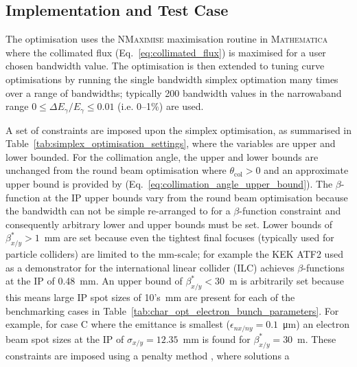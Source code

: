 \documentclass[../main.tex]{subfiles}
\begin{document}
\subsection{Implementation and Test Case}

The optimisation uses the \textsc{NMaximise} maximisation routine in \textsc{Mathematica} \cite{wolfram2021nmaximize} where the collimated flux (Eq.~\ref{eq:collimated_flux}) is maximised for a user chosen bandwidth value. The optimisation is then extended to tuning curve optimisations by running the single bandwidth simplex optimation many times over a range of bandwidths; typically 200 bandwidth values in the narrowaband range $0 \leq \Delta E_{\gamma}/E_{\gamma} \leq 0.01$ (i.e. 0--1\%) are used.   

A set of constraints are imposed upon the simplex optimisation, as summarised in Table~\ref{tab:simplex_optimisation_settings}, where the variables are upper and lower bounded. For the collimation angle, the upper and lower bounds are unchanged from the round beam optimisation where $\theta_{\mathrm{col}} > 0$ and an approximate upper bound is provided by (Eq.~\ref{eq:collimation_angle_upper_bound}). The $\beta$-function at the IP upper bounds vary from the round beam optimisation because the bandwidth can not be simple re-arranged to for a $\beta$-function constraint and consequently arbitrary lower and upper bounds must be set. Lower bounds of $\beta_{x/y}^{*} > 1$~\si{\milli\meter} are set because even the tightest final focuses (typically used for particle colliders) are limited to the \si{\milli\meter}-scale; for example the KEK ATF2 \cite{okugi2016achievemen} used as a demonstrator for the international linear collider (ILC) \cite{yamamoto2021international} achieves $\beta$-functions at the IP of 0.48~\si{\milli\meter}. An upper bound of $\beta_{x/y}^{*} < 30$~\si{\meter} is arbitrarily set because this means large IP spot sizes of 10's~\si{\milli\meter} are present for each of the benchmarking cases in Table~\ref{tab:char_opt_electron_bunch_parameters}. For example, for case C where the emittance is smallest ($\epsilon_{nx/ny} = 0.1$~\si{\micro\meter}) an electron beam spot sizes at the IP of $\sigma_{x/y} = 12.35$~\si{\milli\meter} is found for $\beta_{x/y}^{*} = 30$~\si{\meter}. These constraints are imposed using a penalty method \cite{myers1973response}, where solutions a
\end{document}
